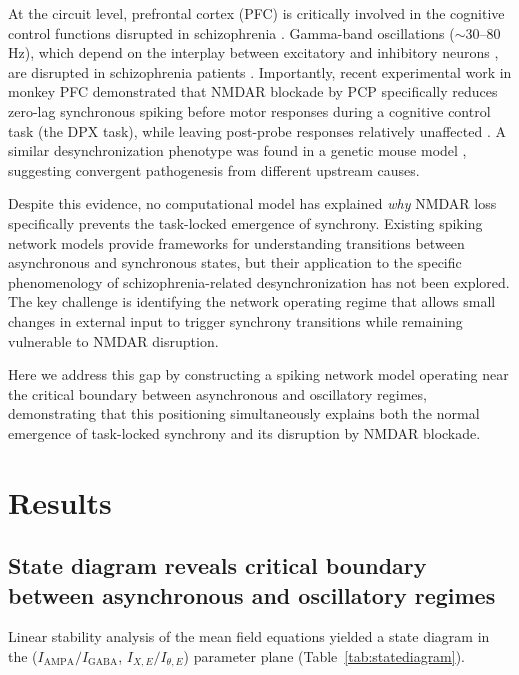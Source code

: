 \documentclass[11pt]{article}
\begin{document}
At the circuit level, prefrontal cortex (PFC) is critically involved in the cognitive control functions disrupted in schizophrenia \citep{miller2001, goldman1995}. Gamma-band oscillations ($\sim$30--80 Hz), which depend on the interplay between excitatory and inhibitory neurons \citep{wang2006, tiesinga2009}, are disrupted in schizophrenia patients \citep{uhlhaas2010, gonzalezburon2015}. Importantly, recent experimental work in monkey PFC demonstrated that NMDAR blockade by PCP specifically reduces zero-lag synchronous spiking before motor responses during a cognitive control task (the DPX task), while leaving post-probe responses relatively unaffected \citep{zick2018}. A similar desynchronization phenotype was found in a genetic mouse model \citep{kummerfeld2020}, suggesting convergent pathogenesis from different upstream causes.

Despite this evidence, no computational model has explained \textit{why} NMDAR loss specifically prevents the task-locked emergence of synchrony. Existing spiking network models \citep{brunel2000, brunel2003} provide frameworks for understanding transitions between asynchronous and synchronous states, but their application to the specific phenomenology of schizophrenia-related desynchronization has not been explored. The key challenge is identifying the network operating regime that allows small changes in external input to trigger synchrony transitions while remaining vulnerable to NMDAR disruption.

Here we address this gap by constructing a spiking network model operating near the critical boundary between asynchronous and oscillatory regimes, demonstrating that this positioning simultaneously explains both the normal emergence of task-locked synchrony and its disruption by NMDAR blockade.

\section{Results}

\subsection{State diagram reveals critical boundary between asynchronous and oscillatory regimes}

Linear stability analysis of the mean field equations yielded a state diagram in the ($I_{\text{AMPA}}/I_{\text{GABA}}$, $I_{X,E}/I_{\theta,E}$) parameter plane (Table~\ref{tab:statediagram}).
\end{document}

